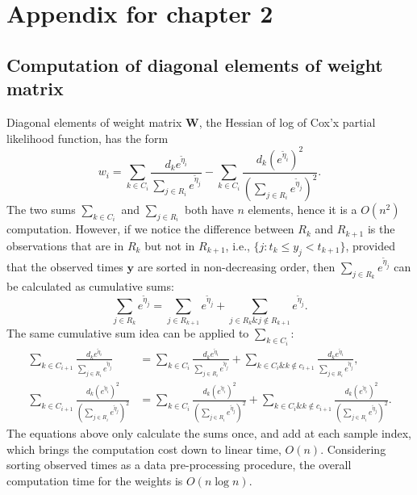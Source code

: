 \section{Appendix for chapter 2}

\subsection{Computation of diagonal elements of weight matrix}
\label{a.1}
Diagonal elements of weight matrix $\bm{W}$, the Hessian of log of Cox'x partial likelihood function, has the form 
\begin{displaymath}
w_i=\sum_{k\in C_i}\frac{d_k e^{\tilde{\eta}_i}}{\sum_{j\in R_i}e^{\tilde{\eta}_j}}-\sum_{k\in C_i}\frac{d_k (e^{\tilde{\eta}_i})^2}{(\sum_{j\in R_i}e^{\tilde{\eta}_j})^2}. 
\end{displaymath}
The two sums $\sum_{k\in C_i}$ and $\sum_{j\in R_i}$ both have $n$ elements, hence it is a $O(n^2)$ computation. However, if we notice the difference between $R_k$ and $R_{k+1}$ is the observations that are in $R_k$ but not in $R_{k+1}$, i.e., $\{j:t_k\leq y_j < t_{k+1}\}$, provided that the observed times $\bm{y}$ are sorted in non-decreasing order, then $\sum_{j\in R_k}e^{\tilde{\eta}_j}$ can be calculated as cumulative sums:
\begin{displaymath}
\sum_{j\in R_k} e^{\tilde{\eta}_j} =\sum_{j\in R_{k+1}} e^{\tilde{\eta}_j}+ \sum_{j\in R_k \& j\notin R_{k+1}} e^{\tilde{\eta}_j}.
\end{displaymath}
The same cumulative sum idea can be applied to $\sum_{k\in C_i}$: 
\begin{align*}
    \sum_{k\in C_{i+1}}\frac{d_k e^{\tilde{\eta}_i}}{\sum_{j\in R_i}e^{\tilde{\eta}_j}}&=\sum_{k\in C_i}\frac{d_k e^{\tilde{\eta}_i}}{\sum_{j\in R_i}e^{\tilde{\eta}_j}}+\sum_{k\in C_i\&k\notin c_{i+1}}\frac{d_k e^{\tilde{\eta}_i}}{\sum_{j\in R_i}e^{\tilde{\eta}_j}}, \\
    \sum_{k\in C_{i+1}}\frac{d_k (e^{\tilde{\eta}_i})^2}{(\sum_{j\in R_i}e^{\tilde{\eta}_j})^2}&=\sum_{k\in C_i}\frac{d_k (e^{\tilde{\eta}_i})^2}{(\sum_{j\in R_i}e^{\tilde{\eta}_j})^2}+ \sum_{k\in C_i\&k\notin c_{i+1}}\frac{d_k (e^{\tilde{\eta}_i})^2}{(\sum_{j\in R_i}e^{\tilde{\eta}_j})^2}.
\end{align*}
The equations above only calculate the sums once, and add at each sample index, which brings the computation cost down to linear time, $O(n)$. Considering sorting observed times as a data pre-processing procedure, the overall computation time for the weights is $O(n\log n)$.

